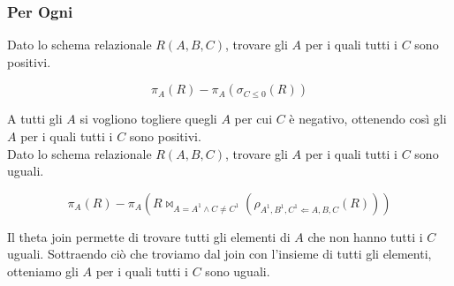 \subsubsection{Per Ogni}

Dato lo schema relazionale $R(A,B,C)$, trovare gli $A$ per i quali tutti i $C$ sono positivi.

\begin{displaymath}
  \pi_{A}(R) - \pi_{A}(\sigma_{C \leq 0}(R))
\end{displaymath}

A tutti gli $A$ si vogliono togliere quegli $A$ per cui $C$ è negativo, ottenendo così
gli $A$ per i quali tutti i $C$ sono positivi. \\

\noindent
Dato lo schema relazionale $R(A,B,C)$, trovare gli $A$ per i quali tutti i $C$ sono uguali.

\begin{displaymath}
  \pi_{A}(R) - \pi_{A}(R \bowtie_{A=A^1 \land C \neq C^1}(\rho_{A^1,B^1,C^1 \Leftarrow A,B,C}(R)))
\end{displaymath}

Il theta join permette di trovare tutti gli elementi di $A$ che non hanno tutti i $C$ uguali.
Sottraendo ciò che troviamo dal join con l'insieme di tutti gli elementi, otteniamo gli $A$ per
i quali tutti i $C$ sono uguali.
